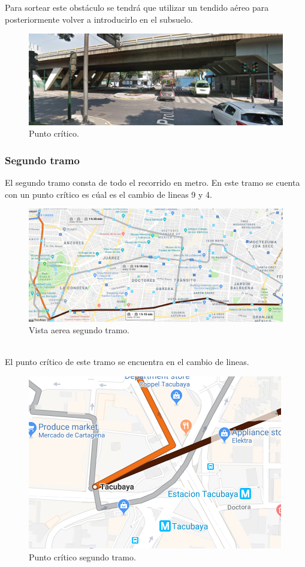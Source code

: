\documentclass[12pt,letterpaper]{article}
\begin{document}
Para sortear este obstáculo se tendrá que utilizar un tendido aéreo 
para posteriormente volver a introducirlo en el subsuelo.
\begin{figure}[ht]
    \centering
    \includegraphics[width=1\textwidth]{f6.png}
    \caption{Punto crítico.}
\end{figure}

\subsubsection{Segundo tramo}
El segundo tramo consta de todo el recorrido en metro. En este 
tramo se cuenta con un punto crítico es cúal es el cambio de lineas 
9 y 4.
\begin{figure}[ht]
    \centering
    \includegraphics[width=1\textwidth]{f7.png}
    \caption{Vista aerea segundo tramo.}
\end{figure}
\\
El punto crítico de este tramo se encuentra en el cambio de lineas.
\begin{figure}[ht]
    \centering
    \includegraphics[width=.5\textwidth]{f8.png}
    \caption{Punto crítico segundo tramo.}
\end{figure}
\end{document}
